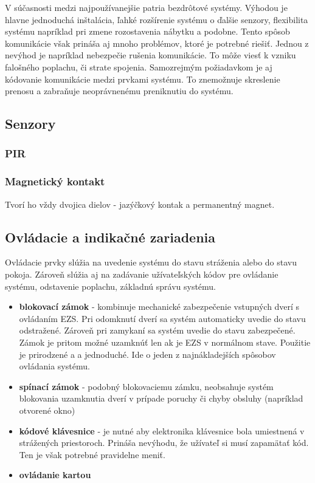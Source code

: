 V súčasnosti medzi najpoužívanejšie patria bezdrôtové systémy. Výhodou je hlavne jednoduchá inštalácia, ľahké rozšírenie systému o ďalšie senzory, flexibilita systému napríklad pri zmene rozostavenia nábytku a podobne. Tento spôsob komunikácie však prináša aj mnoho problémov, ktoré je potrebné riešiť. Jednou z nevýhod je napríklad nebezpečie rušenia komunikácie. To môže viesť k vzniku falošného poplachu, či strate spojenia. Samozrejmým požiadavkom je aj kódovanie komunikácie medzi prvkami systému. To znemožnuje skreslenie prenosu a zabraňuje neoprávnenému preniknutiu do systému.

\subsection{Senzory}

\subsubsection{PIR}

\subsubsection{Magnetický kontakt}

Tvorí ho vždy dvojica dielov - jazýčkový kontak a permanentný magnet.

\subsection{Ovládacie a indikačné zariadenia}

Ovládacie prvky slúžia na uvedenie systému do stavu stráženia alebo do stavu pokoja. Zároveň slúžia aj na zadávanie užívateľských kódov pre ovládanie systému, odstavenie poplachu, základnú správu systému.
\begin{itemize}
    \item \textbf{blokovací zámok} - kombinuje mechanické zabezpečenie vstupných dverí s ovládaním EZS. Pri odomknutí dverí sa systém automaticky uvedie do stavu odstražené. Zároveň pri zamykaní sa systém uvedie do stavu zabezpečené. Zámok je pritom možné uzamknúť len ak je EZS v normálnom stave. Použitie je prirodzené a a jednoduché. Ide o jeden z najnákladejších spôsobov ovládania systému.
    \item \textbf{spínací zámok} - podobný blokovaciemu zámku, neobsahuje systém blokovania uzamknutia dverí v prípade poruchy či chyby obsluhy (napríklad otvorené okno)
    \item \textbf{kódové klávesnice} - je nutné aby elektronika klávesnice bola umiestnená v strážených priestoroch. Prináša nevýhodu, že užívateľ si musí zapamätať kód. Ten je však potrebné pravidelne meniť.
    \item \textbf{ovládanie kartou}
\end{itemize}

